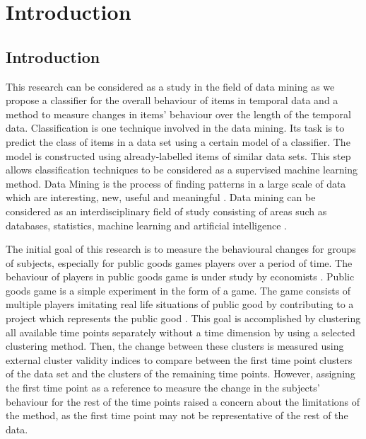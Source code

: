 
\chapter{Introduction}

\label{Chap:Introduction}

\section{Introduction}


This research can be considered as a study in the field of data mining as we propose a classifier for the overall behaviour of items in temporal data and a method to measure changes in items' behaviour over the length of the temporal data. Classification is one technique involved in the data mining. Its task is to predict the class of items in a data set using a certain model of a classifier. The model is constructed using already-labelled items of similar data sets. This step allows classification techniques to be considered as a supervised machine learning method. Data Mining is the process of finding patterns in a large scale of data which are interesting, new, useful and meaningful \cite{Zaki2014}. Data mining can be considered as an interdisciplinary field of study consisting of areas such as databases, statistics, machine learning and artificial intelligence \cite{Chakrabarti2006}.

The initial goal of this research is to measure the behavioural changes for groups of subjects, especially for public goods games players over a period of time. The behaviour of players in public goods game is under study by economists  \cite{Fischbacher2012, Palfrey1997a}. Public goods game is a simple experiment in the form of a game. The game consists of multiple players imitating real life situations of public good by contributing to a project which represents the public good \cite{Dufwenberg2011}. This goal is accomplished by clustering all available time points separately without a time dimension by using a selected clustering method. Then, the change between these clusters is measured using external cluster validity indices \cite{Halkidi2002a} to compare between the first time point clusters of the data set and the clusters of the remaining time points. However, assigning the first time point as a reference to measure the change in the subjects' behaviour for the rest of the time points raised a concern about the limitations of the method, as the first time point may not be representative of the rest of the data.

